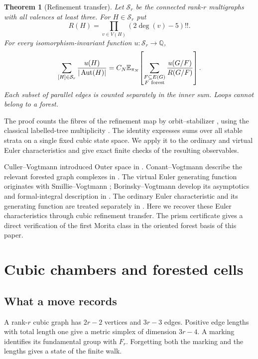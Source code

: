 \documentclass[11pt]{article}
\newtheorem{theorem}{Theorem}[section]
\theoremstyle{definition}
\newcommand{\Aut}{\operatorname{Aut}}
\newcommand{\E}{\mathbb E}
\newcommand{\Q}{\mathbb Q}
\numberwithin{equation}{section}
\begin{document}
\begin{theorem}[Refinement transfer]\label{thm:transfer}
Let $\mathcal S_r$ be the connected rank-$r$ multigraphs with all
valences at least three. For $H\in\mathcal S_r$ put
\[
 R(H)=\prod_{v\in V(H)}(2\deg(v)-5)!!.
\]
For every isomorphism-invariant function $u:\mathcal S_r\to\Q$,
\begin{equation}\label{eq:transfer}
 \sum_{[H]\in\mathcal S_r}\frac{u(H)}{|\Aut(H)|}
 =C_N\E_{\pi_N}\!
   \left[\sum_{\substack{F\subseteq E(G)\\F\ {\rm forest}}}
                     \frac{u(G/F)}{R(G/F)}\right].
\end{equation}
Each subset of parallel edges is counted separately in the inner sum.
Loops cannot belong to a forest.
\end{theorem}

The proof counts the fibres of the refinement map by
orbit--stabilizer \cite{Groupoidification}, using the classical
labelled-tree multiplicity \cite{BHV}. The identity expresses sums over
all stable strata on a single fixed cubic state space. We apply it
to the ordinary and virtual Euler characteristics and give exact
finite checks of the resulting observables.

Culler--Vogtmann introduced Outer space in \cite{CV86}.
Conant--Vogtmann describe the relevant forested graph complexes in
\cite{ConantVogtmann}. The virtual Euler generating function originates
with Smillie--Vogtmann \cite{SmillieVogtmann}; Borinsky--Vogtmann develop
its asymptotics and formal-integral description in
\cite{BV2020,BVQFT}. The ordinary Euler characteristic and its generating
function are treated separately in \cite{BV2023}. Here we recover these
Euler characteristics through cubic refinement transfer. The prism
certificate gives a direct verification of the first Morita class
in the oriented forest basis of this paper.

\section{Cubic chambers and forested cells}

\subsection{What a move records}
A rank-$r$ cubic graph has $2r-2$ vertices and $3r-3$ edges.
Positive edge lengths with total length one give a metric simplex
of dimension $3r-4$. A marking identifies its fundamental group with
$F_r$. Forgetting both the marking and the lengths gives a state of
the finite walk.
\end{document}
